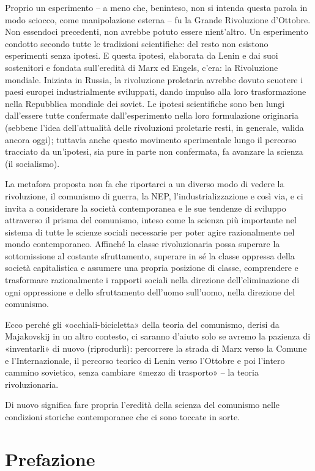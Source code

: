 \documentclass[12pt,a4paper,openany]{book}
\begin{document}
Proprio un esperimento – a meno che, beninteso, non si intenda questa parola in modo sciocco, come manipolazione esterna – fu la Grande Rivoluzione d'Ottobre. Non essendoci precedenti, non avrebbe potuto essere nient'altro. Un esperimento condotto secondo tutte le tradizioni scientifiche: del resto non esistono esperimenti senza ipotesi. E questa ipotesi, elaborata da Lenin e dai suoi sostenitori e fondata sull'eredità di Marx ed Engels, c'era: la Rivoluzione mondiale. Iniziata in Russia, la rivoluzione proletaria avrebbe dovuto scuotere i paesi europei industrialmente sviluppati, dando impulso alla loro trasformazione nella Repubblica mondiale dei soviet. Le ipotesi scientifiche sono ben lungi dall'essere tutte confermate dall'esperimento nella loro formulazione originaria (sebbene l'idea dell'attualità delle rivoluzioni proletarie resti, in generale, valida ancora oggi); tuttavia anche questo movimento sperimentale lungo il percorso tracciato da un'ipotesi, sia pure in parte non confermata, fa avanzare la scienza (il socialismo).

La metafora proposta non fa che riportarci a un diverso modo di vedere la rivoluzione, il comunismo di guerra, la NEP, l'industrializzazione e così via, e ci invita a considerare la società contemporanea e le sue tendenze di sviluppo attraverso il prisma del comunismo, inteso come la scienza più importante nel sistema di tutte le scienze sociali necessarie per poter agire razionalmente nel mondo contemporaneo. Affinché la classe rivoluzionaria possa superare la sottomissione al costante sfruttamento, superare in sé la classe oppressa della società capitalistica e assumere una propria posizione di classe, comprendere e trasformare razionalmente i rapporti sociali nella direzione dell'eliminazione di ogni oppressione e dello sfruttamento dell'uomo sull'uomo, nella direzione del comunismo.

Ecco perché gli «occhiali-bicicletta» della teoria del comunismo, derisi da Majakovskij in un altro contesto, ci saranno d'aiuto solo se avremo la pazienza di «inventarli» di nuovo (riprodurli): percorrere la strada di Marx verso la Comune e l'Internazionale, il percorso teorico di Lenin verso l'Ottobre e poi l'intero cammino sovietico, senza cambiare «mezzo di trasporto» – la teoria rivoluzionaria.

Di nuovo significa fare propria l'eredità della scienza del comunismo nelle condizioni storiche contemporanee che ci sono toccate in sorte.
\ifSubfilesClassLoaded{\setcounter{page}{7}}{}
\section{Prefazione}
\label{sec:02_prefazione}
\end{document}
